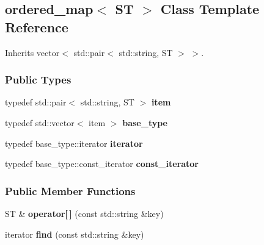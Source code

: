\hypertarget{classordered__map}{}\subsection{ordered\+\_\+map$<$ S\+T $>$ Class Template Reference}
\label{classordered__map}


Inherits vector$<$ std\+::pair$<$ std\+::string, S\+T $>$ $>$.

\subsubsection*{Public Types}
\begin{DoxyCompactItemize}
\item 
\hypertarget{classordered__map_a47570710dd418e42d21a6de2a724b4d8}{}typedef std\+::pair$<$ std\+::string, S\+T $>$ {\bfseries item}\label{classordered__map_a47570710dd418e42d21a6de2a724b4d8}

\item 
\hypertarget{classordered__map_add67dc9887abc2e5f1d525b97bd68da2}{}typedef std\+::vector$<$ item $>$ {\bfseries base\+\_\+type}\label{classordered__map_add67dc9887abc2e5f1d525b97bd68da2}

\item 
\hypertarget{classordered__map_a2a54bd58602dd9203e33ac3d19b948cf}{}typedef base\+\_\+type\+::iterator {\bfseries iterator}\label{classordered__map_a2a54bd58602dd9203e33ac3d19b948cf}

\item 
\hypertarget{classordered__map_ab964c70bd8eb10fbb49ed59960732031}{}typedef base\+\_\+type\+::const\+\_\+iterator {\bfseries const\+\_\+iterator}\label{classordered__map_ab964c70bd8eb10fbb49ed59960732031}

\end{DoxyCompactItemize}
\subsubsection*{Public Member Functions}
\begin{DoxyCompactItemize}
\item 
\hypertarget{classordered__map_a4b9e50a5ceaec5fcfb4c89cb6cce65db}{}S\+T \& {\bfseries operator\mbox{[}$\,$\mbox{]}} (const std\+::string \&key)\label{classordered__map_a4b9e50a5ceaec5fcfb4c89cb6cce65db}

\item 
\hypertarget{classordered__map_a26e74f8da94da42b8e3404c145de3d4f}{}iterator {\bfseries find} (const std\+::string \&key)\label{classordered__map_a26e74f8da94da42b8e3404c145de3d4f}

\end{DoxyCompactItemize}


